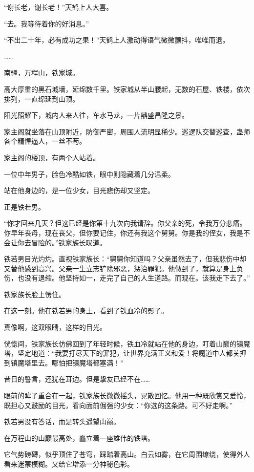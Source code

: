 \begin{this_body}
“谢长老，谢长老！”天鹤上人大喜。

“去。我等待着你的好消息。”

“不出二十年，必有成功之果！”天鹤上人激动得语气微微颤抖，唯唯而退。

……

南疆，万程山，铁家城。

高大厚重的黑石城墙，延绵数千里。铁家城从半山腰起，无数的石屋、铁楼，依次排列，一直绵延到山顶。

阳光照耀下，城内人来人往，车水马龙，一片鼎盛昌隆之景。

家主阁就坐落在山顶附近，防御严密，周围人流明显稀少。巡逻队交替巡查，蛊师各个精悍逼人，一丝不苟。

家主阁的楼顶，有两个人站着。

一位中年男子，脸色冷酷如铁，眼中则隐藏着几分温柔。

站在他身边的，是一位少女，目光悲伤却又坚定。

正是铁若男。

“你才回来几天？但这已经是你第十九次向我请辞。你父亲的死，令我万分悲痛。你早年丧母，现在丧父，但你要记住，你还有我这个舅舅。你是我的侄女，我是不会让你去冒险的。”铁家族长叹道。

铁若男目光灼灼。直视铁家族长：“舅舅你知道吗？父亲虽然去了，但我悲伤中却又替他感到高兴。父亲一生立志铲除邪恶，惩治罪犯。他做到了，就算是身上负伤，也没有退缩。他坚持如一，走完了自己的人生道路。而现在。该我走下去了。”

铁家族长脸上愣住。

在这一刻。他在铁若男的身上，看到了铁血冷的影子。

真像啊，这双眼睛，这样的目光。

恍惚间，铁家族长仿佛回到了年轻时候，铁血冷就站在他的身边，盯着山巅的镇魔塔，坚定地道：“我要打尽天下的罪犯，让世界充满正义和爱！将魔道中人都关押到镇魔塔里去。哪怕把镇魔塔都塞满！”

昔日的誓言，还犹在耳边。但是挚友已经不在……

眼前的眸子重合在一起，铁家族长微微摇头，晃散回忆。他用一种既欣赏又爱怜，既担心又鼓励的目光，看向面前倔强的少女：“你选的这条路。可不好走啊。”

铁若男没有答话，而是转头遥望山巅。

在万程山的山巅最高处，矗立着一座雄伟的铁塔。

它气势磅礴，似乎顶住了苍穹，踩踏着高山。白云如雾，在它周围缭绕，使得外人看来迷蒙模糊。又给它增添一分神秘色彩。


\end{this_body}
